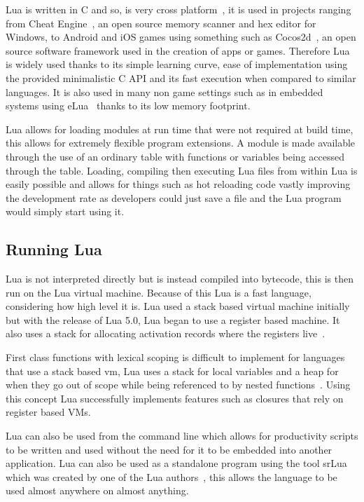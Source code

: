 \documentclass[11pt,a4paper,titlepage]{report}
\begin{document}
	Lua is written in C and so, is very cross platform~\cite{LuaSource}, it is used in projects ranging from Cheat Engine~\cite{CheatEngine}, an open source memory scanner and hex editor for Windows, to Android and iOS games using something such as Cocos2d~\cite{COCOS2D}, an open source software framework used in the creation of apps or games. Therefore Lua is widely used thanks to its simple learning curve, ease of implementation using the provided minimalistic C API and its fast execution when compared to similar languages. It is also used in many non game settings such as in embedded systems using eLua~\cite{eLua} thanks to its low memory footprint.

	Lua allows for loading modules at run time that were not required at build time, this allows for extremely flexible program extensions. A module is made available through the use of an ordinary table with functions or variables being accessed through the table. Loading, compiling then executing Lua files from within Lua is easily possible and allows for things such as hot reloading code vastly improving the development rate as developers could just save a file and the Lua program would simply start using it.
		
\subsection{Running Lua}
	Lua is not interpreted directly but is instead compiled into bytecode, this is then run on the Lua virtual machine. Because of this Lua is a fast language, considering how high level it is. Lua used a stack based virtual machine initially but with the release of Lua 5.0, Lua began to use a register based machine. It also uses a stack for allocating activation records where the registers live~\cite{IerusalimschyImplementation}.

	First class functions with lexical scoping is difficult to implement for languages that use a stack based vm, Lua uses a stack for local variables and a heap for when they go out of scope while being referenced to by nested functions~\cite{IerusalimschyImplementation}. Using this concept Lua successfully implements features such as closures that rely on register based VMs.

	Lua can also be used from the command line which allows for productivity scripts to be written and used without the need for it to be embedded into another application. Lua can also be used as a standalone program using the tool srLua which was created by one of the Lua authors~\cite{tecgrafLibAndTools}, this allows the language to be used almost anywhere on almost anything.
\end{document}
